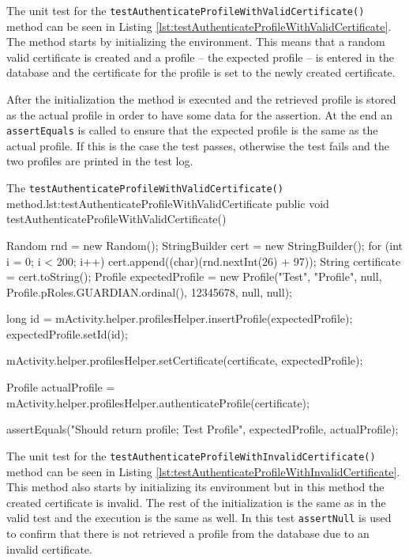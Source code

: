 The unit test for the \texttt{testAuthenticateProfileWithValidCertificate()} method can be seen in Listing \vref{lst:testAuthenticateProfileWithValidCertificate}.
The method starts by initializing the environment.
This means that a random valid certificate is created and a profile -- the expected profile -- is entered in the database and the certificate for the profile is set to the newly created certificate.

After the initialization the method is executed and the retrieved profile is stored as the actual profile in order to have some data for the assertion.
At the end an \texttt{assertEquals} is called to ensure that the expected profile is the same as the actual profile.
If this is the case the test passes, otherwise the test fails and the two profiles are printed in the test log. 


\begin{Java}{The \texttt{testAuthenticateProfileWithValidCertificate()} method.}{lst:testAuthenticateProfileWithValidCertificate}
public void testAuthenticateProfileWithValidCertificate() {
	Random rnd = new Random();
	StringBuilder cert = new StringBuilder();
	for (int i = 0; i < 200; i++)
	{
		cert.append((char)(rnd.nextInt(26) + 97));
	}
	String certificate = cert.toString();
	Profile expectedProfile = new Profile("Test", "Profile", null, Profile.pRoles.GUARDIAN.ordinal(), 12345678, null, null);

	long id = mActivity.helper.profilesHelper.insertProfile(expectedProfile);
	expectedProfile.setId(id);
	
	mActivity.helper.profilesHelper.setCertificate(certificate, expectedProfile);

	Profile actualProfile = mActivity.helper.profilesHelper.authenticateProfile(certificate);

	assertEquals("Should return profile; Test Profile", expectedProfile, actualProfile);
}
\end{Java}

The unit test for the \texttt{testAuthenticateProfileWithInvalidCertificate()} method can be seen in Listing \vref{lst:testAuthenticateProfileWithInvalidCertificate}.
This method also starts by initializing its environment but in this method the created certificate is invalid.
The rest of the initialization is the same as in the valid test and the execution is the same as well.
In this test \texttt{assertNull} is used to confirm that there is not retrieved a profile from the database due to an invalid certificate.

